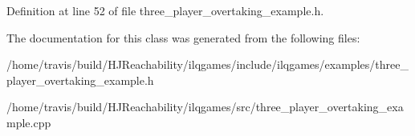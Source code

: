 Definition at line 52 of file three\+\_\+player\+\_\+overtaking\+\_\+example.\+h.



The documentation for this class was generated from the following files\+:\begin{DoxyCompactItemize}
\item 
/home/travis/build/\+H\+J\+Reachability/ilqgames/include/ilqgames/examples/three\+\_\+player\+\_\+overtaking\+\_\+example.\+h\item 
/home/travis/build/\+H\+J\+Reachability/ilqgames/src/three\+\_\+player\+\_\+overtaking\+\_\+example.\+cpp\end{DoxyCompactItemize}
